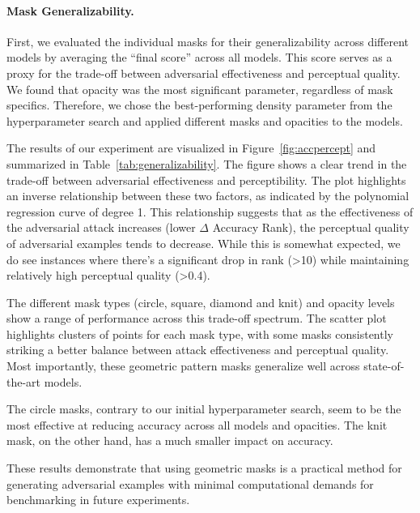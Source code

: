 \documentclass[a4paper, oneside]{discothesis}
\begin{document}
\paragraph{Mask Generalizability.}

First, we evaluated the individual masks for their generalizability across different models by averaging the ``final score'' across all models. This score serves as a proxy for the trade-off between adversarial effectiveness and perceptual quality. We found that opacity was the most significant parameter, regardless of mask specifics. Therefore, we chose the best-performing density parameter from the hyperparameter search and applied different masks and opacities to the models.

The results of our experiment are visualized in Figure~\ref{fig:accpercept} and summarized in Table~\ref{tab:generalizability}. The figure shows a clear trend in the trade-off between adversarial effectiveness and perceptibility. The plot highlights an inverse relationship between these two factors, as indicated by the polynomial regression curve of degree 1. This relationship suggests that as the effectiveness of the adversarial attack increases (lower $\Delta$ Accuracy Rank), the perceptual quality of adversarial examples tends to decrease. While this is somewhat expected, we do see instances where there's a significant drop in rank (>10) while maintaining relatively high perceptual quality (>0.4).

The different mask types (circle, square, diamond and knit) and opacity levels show a range of performance across this trade-off spectrum. The scatter plot highlights clusters of points for each mask type, with some masks consistently striking a better balance between attack effectiveness and perceptual quality. Most importantly, these geometric pattern masks generalize well across state-of-the-art models.

The circle masks, contrary to our initial hyperparameter search, seem to be the most effective at reducing accuracy across all models and opacities. The knit mask, on the other hand, has a much smaller impact on accuracy.

These results demonstrate that using geometric masks is a practical method for generating adversarial examples with minimal computational demands for benchmarking in future experiments.
\end{document}
